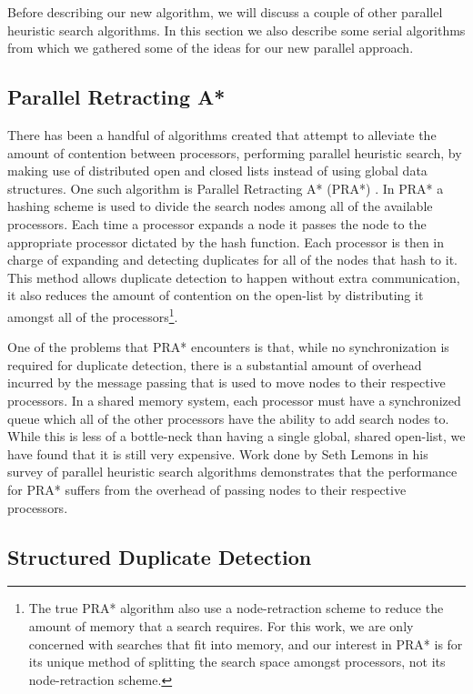 \documentclass{article}
\begin{document}
Before describing our new algorithm, we will discuss a couple of other
parallel heuristic search algorithms.  In this section we also
describe some serial algorithms from which we gathered some of the
ideas for our new parallel approach.

\subsection{Parallel Retracting A*}

There has been a handful of algorithms created that attempt to
alleviate the amount of contention between processors, performing
parallel heuristic search, by making use of distributed open and
closed lists instead of using global data structures.  One such
algorithm is Parallel Retracting A* (PRA*) \cite{evett:pra}.  In PRA*
a hashing scheme is used to divide the search nodes among all of the
available processors.  Each time a processor expands a node it passes
the node to the appropriate processor dictated by the hash function.
Each processor is then in charge of expanding and detecting duplicates
for all of the nodes that hash to it.  This method allows duplicate
detection to happen without extra communication, it also reduces the
amount of contention on the open-list by distributing it amongst all
of the processors\footnote{The true PRA* algorithm also use a
  node-retraction scheme to reduce the amount of memory that a search
  requires.  For this work, we are only concerned with searches that
  fit into memory, and our interest in PRA* is for its unique method
  of splitting the search space amongst processors, not its
  node-retraction scheme.}.

One of the problems that PRA* encounters is that, while no
synchronization is required for duplicate detection, there is a
substantial amount of overhead incurred by the message passing that is
used to move nodes to their respective processors.  In a shared memory
system, each processor must have a synchronized queue which all of the
other processors have the ability to add search nodes to.  While this
is less of a bottle-neck than having a single global, shared
open-list, we have found that it is still very expensive.  Work done
by Seth Lemons in his survey of parallel heuristic search algorithms
demonstrates that the performance for PRA* \cite{lemons:sur} suffers
from the overhead of passing nodes to their respective processors.

\subsection{Structured Duplicate Detection}
\end{document}

